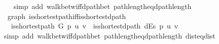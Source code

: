 \begin{isabellebody}
\ \ \isamarkupfalse%
\ {\isacharparenleft}{\kern0pt}simp\ add{\isacharcolon}{\kern0pt}\ walk{\isacharunderscore}{\kern0pt}betw{\isacharunderscore}{\kern0pt}iff{\isacharunderscore}{\kern0pt}dpath{\isacharunderscore}{\kern0pt}bet\ path{\isacharunderscore}{\kern0pt}length{\isacharunderscore}{\kern0pt}eq{\isacharunderscore}{\kern0pt}dpath{\isacharunderscore}{\kern0pt}length{\isacharparenright}{\kern0pt}%
\endisatagproof
{\isafoldproof}%
%
\isadelimproof
\isanewline
%
\endisadelimproof
\isanewline
{}\isamarkupfalse%
\ {\isacharparenleft}{\kern0pt}\ graph{\isacharparenright}{\kern0pt}\ is{\isacharunderscore}{\kern0pt}shortest{\isacharunderscore}{\kern0pt}path{\isacharunderscore}{\kern0pt}iff{\isacharunderscore}{\kern0pt}is{\isacharunderscore}{\kern0pt}shortest{\isacharunderscore}{\kern0pt}dpath{\isacharcolon}{\kern0pt}\isanewline
\ \ \ {\isachardoublequoteopen}is{\isacharunderscore}{\kern0pt}shortest{\isacharunderscore}{\kern0pt}path\ G\ p\ u\ v\ {\isacharequal}{\kern0pt}\ is{\isacharunderscore}{\kern0pt}shortest{\isacharunderscore}{\kern0pt}dpath\ dEs\ p\ u\ v{\isachardoublequoteclose}\isanewline
%
\isadelimproof
\ \ %
\endisadelimproof
%
\isatagproof
{}\isamarkupfalse%
\ {\isacharparenleft}{\kern0pt}simp\ add{\isacharcolon}{\kern0pt}\ walk{\isacharunderscore}{\kern0pt}betw{\isacharunderscore}{\kern0pt}iff{\isacharunderscore}{\kern0pt}dpath{\isacharunderscore}{\kern0pt}bet\ path{\isacharunderscore}{\kern0pt}length{\isacharunderscore}{\kern0pt}eq{\isacharunderscore}{\kern0pt}dpath{\isacharunderscore}{\kern0pt}length\ dist{\isacharunderscore}{\kern0pt}eq{\isacharunderscore}{\kern0pt}dist{\isacharparenright}{\kern0pt}%
\endisatagproof
{\isafoldproof}%
%
\isadelimproof
\isanewline
%
\endisadelimproof
%
\isadelimtheory
\isanewline
%
\endisadelimtheory
%
\isatagtheory
{}\isamarkupfalse%
%
\endisatagtheory
{\isafoldtheory}%
%
\isadelimtheory
%
\endisadelimtheory
%
\end{isabellebody}%
\endinput
